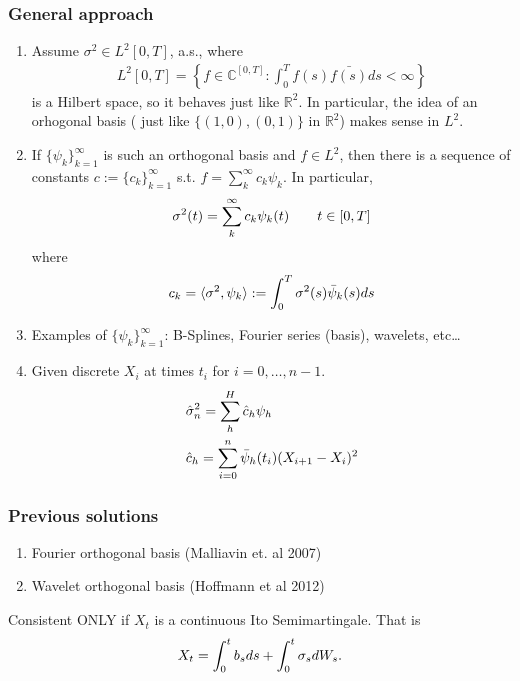\documentclass[fleqn]{beamer}
\begin{document}
\begin{frame}[allowframebreaks]
  \frametitle{General approach}
  \begin{enumerate}
    \item Assume $\sigma^2 \in L^2[0, T]$, a.s., where 
      \begin{align}
        L^2[0,T] = \left\{ f \in \mathbb{C}^{[0,T]}: \int^T_0 f(s) \bar{f(s)} d s < \infty\right\}
      \end{align}
      is a Hilbert space, so it behaves just like $\mathbb{R}^2$. In particular, the idea of an orhogonal basis ( just like $\{(1,0), (0,1)\}$ in $\mathbb{R}^2$) makes sense in $L^2$.  
    \item If $\{\psi_k\}_{k =1}^\infty$ is such an orthogonal basis and  $f \in L^2$, then there is a sequence of constants $c := \{c_k\}_{k = 1}^\infty$ s.t. $f = \sum_k^{\infty} c_k \psi_k$. 
    In particular,  
      \begin{align}
        \sigma^2(t)  &= \sum_k^{\infty} c_k \psi_k(t) \qquad t \in [0,T]\notag\\
        \label{}
      \end{align}
      where 
      \begin{align}
        c_k = \langle \sigma^2 , \psi_k\rangle : = \int^T_0 \sigma^2(s) \bar{\psi}_k(s) d s\notag
        \label{}
      \end{align}
    \item Examples of $\{\psi_k\}_{k =1}^\infty$: B-Splines, Fourier series (basis), wavelets, etc\dots 
    \item Given discrete $X_i$ at times $t_i$ for $i = 0, \dots, n-1$.
      \begin{align}
        &\hat{\sigma}^2_n  = \sum_h^H \hat{c}_h \psi_h\notag\\
        &\hat{c}_h = \sum^n_{i = 0} \bar{\psi}_h(t_i)(X_{i +1} - X_i)^2 
        \label{}
      \end{align}
  \end{enumerate}
\end{frame}
\begin{frame}
  \frametitle{Previous solutions}
   \begin{enumerate}
    \item Fourier orthogonal basis (Malliavin et. al 2007)
    \item Wavelet orthogonal basis (Hoffmann et al 2012)
  \end{enumerate}
  Consistent ONLY if $X_t$ is a continuous Ito Semimartingale.
  That is \begin{align}
    X_t = \int^t_0 b_s d s + \int^t_0 \sigma_s d W_s. \notag
    \label{}
  \end{align}
\end{frame}
\end{document}
